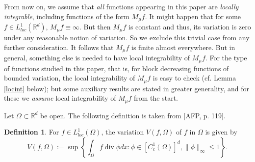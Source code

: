\documentclass[12pt]{amsart}
\numberwithin{equation}{section}
\theoremstyle{plain}
\theoremstyle{definition}
\newtheorem{definition}[theorem]{Definition}
\theoremstyle{remark}
\begin{document}
From now on, we assume that {\em all} functions appearing in this
paper are {\em locally integrable}, including functions of the form
$M_\mu f$. It might happen that for some
$f\in L^1_{loc} (\mathbb{R}^d)$, $M_\mu f \equiv\infty$. But then
 $M_\mu f$ is constant and thus, its variation is zero under any
 reasonable notion of variation. So we exclude this
 trivial case from any further consideration. It follows
 that $M_\mu f$ is finite almost everywhere.
 But in general, something else is needed to have local integrability
 of $M_\mu f$.  For the type of
 functions studied in this paper, that is, for block decreasing
 functions of bounded variation, the local integrability of
 $M_\mu f$ is easy to check (cf. Lemma \ref{locint} below);
but some auxiliary results are stated in greater generality,
and for these we {\em assume} local integrability of $M_\mu f$
from the start.

Let $\Omega\subset \mathbb{R}^d$ be   open. The following definition
 is taken from [AFP, p. 119].

\begin{definition}\label{defvar}
For $f\in L^1_{loc}(\Omega)$, the variation $V(f,\Omega)$ of $f$
  in $\Omega$ is given by
  \begin{equation*}
    V(f,\Omega):=\sup \left\{\int_\Omega f \operatorname{div}\phi dx: \phi \in [C^1_c(\Omega)]^d,
    \|\phi\|_\infty\le 1\right\}.
  \end{equation*}
\end{definition}
\end{document}
